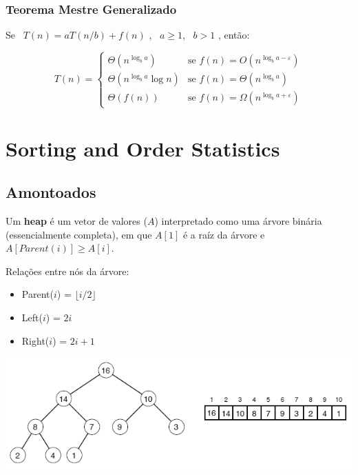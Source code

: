 \documentclass[11pt]{article}
\newcommand{\threepartdef}[6]
{ \displaystyle
	\left\{
		\begin{array}{ll}
			#1 & \mbox{se } #2 \\
			#3 & \mbox{se } #4 \\
            #5 & \mbox{se } #6
		\end{array}
	\right.
}
\begin{document}
\subsubsection{Teorema Mestre Generalizado}

Se \ $T(n) = aT(n/b) + f(n)$ , \ $a \ge 1$, \ $b > 1$ , então:

\begin{equation*}
    T(n) = \threepartdef{\Theta(n^{\log_ba})}{f(n) = O(n^{\log_ba-\varepsilon})}
    {\Theta(n^{\log_ba} \log n)}{f(n) = \Theta(n^{\log_ba})}
    {\Theta(f(n))}{f(n) = \Omega(n^{\log_ba+\varepsilon})}
\end{equation*}

\newpage

\section{Sorting and Order Statistics}

\subsection{Amontoados} 

Um \textbf{heap} é um vetor de valores ($A$) interpretado como uma árvore binária (essencialmente completa), em que $A[1]$ é a raíz da árvore e $A[Parent(i)] \ge A[i]$.

\begin{minipage}{0.4\textwidth}
    Relações entre nós da árvore:
    \begin{itemize}
        \item Parent($i$) = $\lfloor i/2 \rfloor$
        \item Left($i$) = $2i$
        \item Right($i$) = $2i + 1$
    \end{itemize}
\end{minipage}
\begin{minipage}{0.59\textwidth}
    \includegraphics[scale=0.7, right]{heap.png}
\end{minipage}
\end{document}
